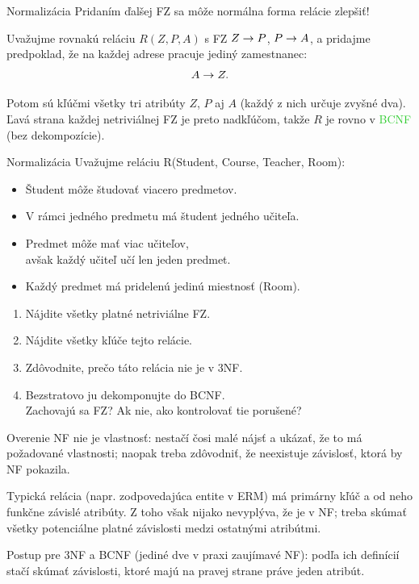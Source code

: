 \documentclass[12pt]{beamer}
\def\green#1{\textcolor{LimeGreen}{#1}}
\begin{document}
\begin{frame}[fragile]{Normalizácia}
Pridaním ďalšej FZ sa môže normálna forma relácie \alert{zlepšiť}!
\bigskip

Uvažujme rovnakú reláciu $R(Z, P, A)$ s FZ $Z\rightarrow P$, $P\rightarrow A$,
a pridajme predpoklad, že na každej adrese pracuje jediný zamestnanec:
$$A\rightarrow Z.$$
\pause
\bigskip

Potom sú kľúčmi všetky tri atribúty $Z$, $P$ aj $A$ (každý z nich určuje zvyšné dva).
Ľavá strana každej netriviálnej FZ je preto nadkľúčom, takže $R$ je rovno v \green{BCNF} (bez dekompozície).
\end{frame}

\begin{frame}[fragile]{Normalizácia}
Uvažujme reláciu R(Student, Course, Teacher, Room):
{\small
\begin{itemize}
\item Študent môže študovať viacero predmetov.
\item V rámci jedného predmetu má študent jedného učiteľa.
\item Predmet môže mať viac učiteľov,\\ avšak každý učiteľ učí len jeden predmet.
\item Každý predmet má pridelenú jedinú miestnosť (Room).
\end{itemize}
}

\medskip
\begin{enumerate}
\item Nájdite všetky platné netriviálne FZ.
\item Nájdite všetky kľúče tejto relácie.
\item Zdôvodnite, prečo táto relácia nie je v 3NF.
\item Bezstratovo ju dekomponujte do BCNF.\\
Zachovajú sa FZ? Ak nie, ako kontrolovať tie porušené?
\end{enumerate}
\end{frame}

\begin{frame}[fragile]{Overenie NF}
 nie je  vlastnosť:
nestačí čosi malé nájsť a ukázať, že to má požadované vlastnosti;
naopak treba zdôvodniť, že neexistuje závislosť, ktorá by NF pokazila.
\bigskip

Typická relácia (napr. zodpovedajúca entite v ERM)
má primárny kľúč a od neho funkčne závislé atribúty.
Z toho však nijako nevyplýva, že je v NF; treba skúmať všetky potenciálne platné závislosti
medzi ostatnými atribútmi.
\bigskip

Postup pre 3NF a BCNF (jediné dve v praxi zaujímavé NF):
podľa ich definícií stačí skúmať závislosti, ktoré majú na pravej strane práve jeden atribút.
\end{frame}
\end{document}
